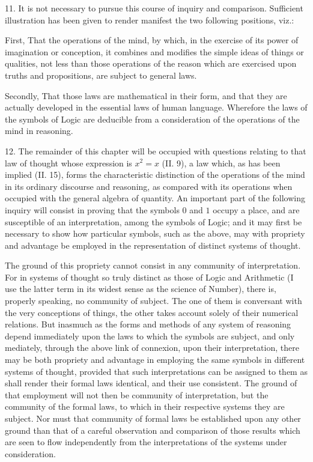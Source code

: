 \documentclass[oneside]{book}
\begin{document}
11. It is not necessary to pursue this course of inquiry and
comparison. Sufficient illustration has been given to render manifest
the two following positions, viz.:

First, That the operations of the mind, by which, in the
exercise of its power of imagination or conception, it combines
and modifies the simple ideas of things or qualities, not less than
those operations of the reason which are exercised upon truths
and propositions, are subject to general laws.

Secondly, That those laws are mathematical in their form,
and that they are actually developed in the essential laws of
human language. Wherefore the laws of the symbols of Logic
are deducible from a consideration of the operations of the mind
in reasoning.

12. The remainder of this chapter will be occupied with
questions relating to that law of thought whose expression is
$x^2 = x$ (II. 9), a law which, as has been implied (II. 15), forms
the characteristic distinction of the operations of the mind in its
ordinary discourse and reasoning, as compared with its operations
when occupied with the general algebra of quantity. An important
part of the following inquiry will consist in proving that
the symbols $0$ and $1$ occupy a place, and are susceptible of an
interpretation, among the symbols of Logic; and it may first be
necessary to show how particular symbols, such as the above,
may with propriety and advantage be employed in the representation
of distinct systems of thought.

The ground of this propriety cannot consist in any community
of interpretation. For in systems of thought so truly
distinct as those of Logic and Arithmetic (I use the latter term
in its widest sense as the science of Number), there is, properly
speaking, no community of subject. The one of them is conversant
with the very conceptions of things, the other takes account
solely of their numerical relations. But inasmuch as the forms
and methods of any system of reasoning depend immediately upon
the laws to which the symbols are subject, and only mediately,
through the above link of connexion, upon their interpretation,
there may be both propriety and advantage in employing the
same symbols in different systems of thought, provided that such
interpretations can be assigned to them as shall render their formal
laws identical, and their use consistent. The ground of that
employment will not then be community of interpretation, but
the community of the formal laws, to which in their respective
systems they are subject. Nor must that community of formal
laws be established upon any other ground than that of a careful
observation and comparison of those results which are seen to
flow independently from the interpretations of the systems under
consideration.
\end{document}
